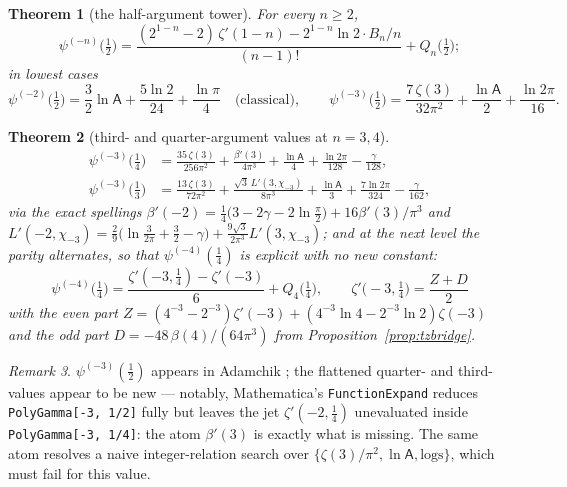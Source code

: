 \documentclass[11pt]{article}
\newtheorem{theorem}{Theorem}[section]
\theoremstyle{remark}
\newtheorem{remark}[theorem]{Remark}
\newcommand{\Glaisher}{\mathsf{A}}
\begin{document}
\begin{theorem}[the half-argument tower]\label{thm:neghalf}
For every $n\ge2$,
\[
\psi^{(-n)}\bigl(\tfrac12\bigr)
=\frac{(2^{1-n}-2)\,\zeta'(1-n)-2^{1-n}\ln2\cdot B_n/n}{(n-1)!}
+Q_n\bigl(\tfrac12\bigr);
\]
in lowest cases
\[
\psi^{(-2)}\bigl(\tfrac12\bigr)
=\frac32\ln\Glaisher+\frac{5\ln2}{24}+\frac{\ln\pi}{4}
\quad\text{(classical)},\qquad
\psi^{(-3)}\bigl(\tfrac12\bigr)
=\frac{7\,\zeta(3)}{32\pi^2}+\frac{\ln\Glaisher}{2}+\frac{\ln2\pi}{16}.
\]
\end{theorem}

\begin{theorem}[third- and quarter-argument values at $n=3,4$]
\label{thm:negthirds}
\begin{align*}
\psi^{(-3)}\bigl(\tfrac14\bigr)
&=\frac{35\,\zeta(3)}{256\pi^2}+\frac{\beta'(3)}{4\pi^3}
+\frac{\ln\Glaisher}{4}+\frac{\ln2\pi}{128}-\frac{\gamma}{128},\\
\psi^{(-3)}\bigl(\tfrac13\bigr)
&=\frac{13\,\zeta(3)}{72\pi^2}+\frac{\sqrt3\,L'(3,\chi_{-3})}{8\pi^3}
+\frac{\ln\Glaisher}{3}+\frac{7\ln2\pi}{324}-\frac{\gamma}{162},
\end{align*}
via the exact spellings
$\beta'(-2)=\tfrac14\bigl(3-2\gamma-2\ln\tfrac\pi2\bigr)+16\beta'(3)/\pi^3$
and
$L'(-2,\chi_{-3})=\tfrac29\bigl(\ln\tfrac3{2\pi}+\tfrac32-\gamma\bigr)
+\tfrac{9\sqrt3}{2\pi^3}L'(3,\chi_{-3})$;
and at the next level the parity alternates, so that
$\psi^{(-4)}(\tfrac14)$ is explicit with \emph{no} new constant:
\[
\psi^{(-4)}\bigl(\tfrac14\bigr)
=\frac{\zeta'(-3,\tfrac14)-\zeta'(-3)}{6}+Q_4\bigl(\tfrac14\bigr),
\qquad
\zeta'\bigl(-3,\tfrac14\bigr)
=\frac{Z+D}{2}
\]
with the even part
$Z=(4^{-3}-2^{-3})\zeta'(-3)+(4^{-3}\ln4-2^{-3}\ln2)\zeta(-3)$ and the odd
part $D=-48\,\beta(4)/(64\pi^3)$ from Proposition~\ref{prop:tzbridge}.
\end{theorem}

\begin{remark}
$\psi^{(-3)}(\tfrac12)$ appears in Adamchik \cite{Adamchik98}; the
flattened quarter- and third-values appear to be new — notably,
Mathematica's \texttt{FunctionExpand} reduces
\texttt{PolyGamma[-3,\,1/2]} fully but leaves the jet
$\zeta'(-2,\tfrac14)$ unevaluated inside \texttt{PolyGamma[-3,\,1/4]}: the
atom $\beta'(3)$ is exactly what is missing. The same atom resolves a
naive integer-relation search over $\{\zeta(3)/\pi^2,
\ln\Glaisher,\text{logs}\}$, which must fail for this value.
\end{remark}
\end{document}
